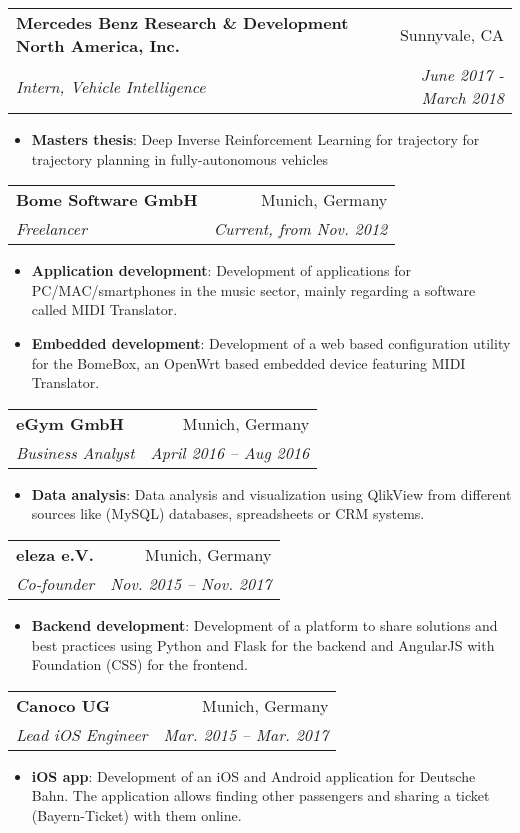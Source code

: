 \documentclass[letterpaper,11pt]{article}
\makeatletter
\newcommand{\resumeItem}[2]{
  \item\small{
    \textbf{#1}{: #2 \vspace{-2pt}}
  }
}
\newcommand{\resumeSubheading}[4]{
  \vspace{-1pt}\item
    \begin{tabular*}{0.97\textwidth}{l@{\extracolsep{\fill}}r}
      \textbf{#1} & #2 \\
      \textit{\small#3} & \textit{\small #4} \\
    \end{tabular*}\vspace{-5pt}
}
\newcommand{\resumeItemListStart}{\begin{itemize}}
\newcommand{\resumeItemListEnd}{\end{itemize}\vspace{-5pt}}
\makeatother
\begin{document}
    \resumeSubheading
      {Mercedes Benz Research \& Development North America, Inc.}{Sunnyvale, CA}
      {Intern, Vehicle Intelligence}{June 2017 - March 2018}
      \resumeItemListStart
        \resumeItem{Masters thesis}
          {Deep Inverse Reinforcement Learning for trajectory for trajectory planning in fully-autonomous vehicles}
      \resumeItemListEnd


    \resumeSubheading
      {Bome Software GmbH}{Munich, Germany}
      {Freelancer}{Current, from Nov. 2012}
      \resumeItemListStart
        \resumeItem{Application development}
          {Development of applications for PC/MAC/smartphones in the music sector, mainly regarding a software called MIDI Translator.}
        \resumeItem{Embedded development} 
          {Development of a web based configuration utility for the BomeBox, an OpenWrt based embedded device featuring MIDI Translator.}
      \resumeItemListEnd

    \resumeSubheading
      {eGym GmbH}{Munich, Germany}
      {Business Analyst}{April 2016 -- Aug 2016}
      \resumeItemListStart
        \resumeItem{Data analysis}
          {Data analysis and visualization using QlikView from different sources like (MySQL) databases, spreadsheets or CRM systems.}
    \resumeItemListEnd

    \resumeSubheading
      {eleza e.V.}{Munich, Germany}
      {Co-founder}{Nov. 2015 -- Nov. 2017}
      \resumeItemListStart
        \resumeItem{Backend development}
          {Development of a platform to share solutions and best practices using Python and Flask for the backend and AngularJS with Foundation (CSS) for the frontend.}
    \resumeItemListEnd

    \resumeSubheading
      {Canoco UG}{Munich, Germany}
      {Lead iOS Engineer}{Mar. 2015 -- Mar. 2017}
      \resumeItemListStart
        \resumeItem{iOS app}
          {Development of an iOS and Android application for Deutsche Bahn. The application allows finding other passengers and sharing a ticket (Bayern-Ticket) with them online.}
    \resumeItemListEnd

\end{document}
